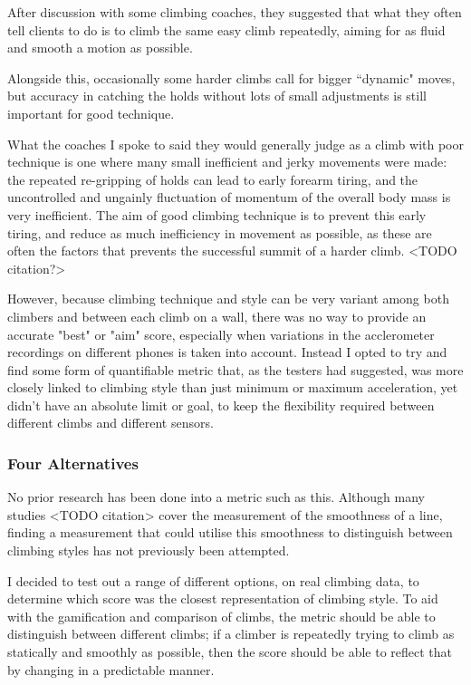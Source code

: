After discussion with some climbing coaches, they suggested that what they often tell clients to do is to climb the same easy climb repeatedly, aiming for as fluid and smooth a motion as possible.




Alongside this, occasionally some harder climbs call for bigger ``dynamic" moves, but accuracy in catching the holds without lots of small adjustments is still important for good technique.


What the coaches I spoke to said they would generally judge as a climb with poor technique is one where many small inefficient and jerky movements were made: the repeated re-gripping of holds can lead to early forearm tiring, and the uncontrolled and ungainly fluctuation of momentum of the overall body mass is very inefficient.
The aim of good climbing technique is to prevent this early tiring, and reduce as much inefficiency in movement as possible, as these are often the factors that prevents the successful summit of a harder climb. <TODO citation?>

However, because climbing technique and style can be very variant among both climbers and between each climb on a wall, there was no way to provide an accurate "best" or "aim" score, especially when variations in the acclerometer recordings on different phones is taken into account.
Instead I opted to try and find some form of quantifiable metric that, as the testers had suggested, was more closely linked to climbing style than just minimum or maximum acceleration, yet didn't have an absolute limit or goal, to keep the flexibility required between different climbs and different sensors.

\subsubsection{Four Alternatives}
No prior research has been done into a metric such as this.
Although many studies <TODO citation> cover the measurement of the smoothness of a line, finding a measurement that could utilise this smoothness to distinguish between climbing styles has not previously been attempted.

I decided to test out a range of different options, on real climbing data, to determine which score was the closest representation of climbing style.
To aid with the gamification and comparison of climbs, the metric should be able to distinguish between different climbs; if a climber is repeatedly trying to climb as statically and smoothly as possible, then the score should be able to reflect that by changing in a predictable manner.

